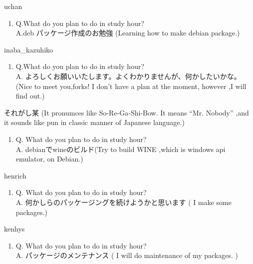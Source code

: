 \begin{prework}{ uchan }
  \begin{enumerate}
  \item Q.What do you plan to do in study hour?\\
    A.deb パッケージ作成のお勉強 (Learning how to make debian package.)
  \end{enumerate}
\end{prework}

\begin{prework}{ inaba\_kazuhiko }
  \begin{enumerate}
  \item Q.What do you plan to do in study hour?\\
    A. よろしくお願いいたします。よくわかりませんが、何かしたいかな。(Nice to meet you,forks! I don't have a plan at the moment, however ,I will find out.)
  \end{enumerate}
\end{prework}

\begin{prework}{ それがし某 }
  (It pronumces like So-Re-Ga-Shi-Bow. It means ``Mr. Nobody'' ,and it sounds like pun in classic manner of Japanese language.)
  \begin{enumerate}
  \item Q. What do you plan to do in study hour?\\
    A. debianでwineのビルド(Try to build WINE ,which is windows api emulator, on Debian.)
  \end{enumerate}
\end{prework}

\begin{prework}{ henrich }
  \begin{enumerate}
  \item Q. What do you plan to do in study hour?\\
    A. 何かしらのパッケージングを続けようかと思います ( I make some packages.)
  \end{enumerate}
\end{prework}

\begin{prework}{ kenhys }
  \begin{enumerate}
  \item Q. What do you plan to do in study hour?\\
    A. パッケージのメンテナンス ( I will do maintenance of my packages. )
  \end{enumerate}
\end{prework}

